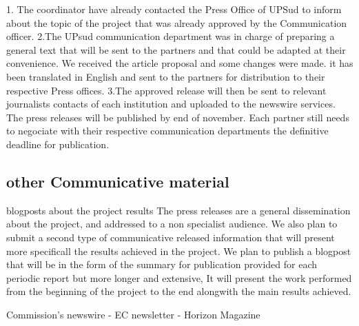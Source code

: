 \documentclass{deliverablereport}
\begin{document}
 1. The coordinator have already contacted the Press Office of UPSud to inform about the topic
 of the project that was already approved by the Communication officer. 
 2.The UPsud communication department was in charge of preparing a general text that will be sent
 to the partners and that could be adapted at their convenience. We received the article proposal 
 and some changes were made. it has been translated in English and sent to the partners 
 for distribution to their respective Press offices. 
 3.The approved release will then be sent to relevant journalists contacts of each institution 
 and uploaded to the newswire services. The press releases will be published by end of november. 
 Each partner still needs to negociate with their respective communication departments the 
 definitive deadline for publication.



\subsection{other Communicative material}

 \item blogposts about the project results
 The press releases are a general dissemination about the project, and addressed to 
 a non specialist audience. We also plan to submit a second type of communicative released 
 information that will present more specificall the results achieved in the project.
 We plan to publish a blogpost that will be in the form of the summary for publication
 provided for each periodic report but more longer and  extensive, It will present the 
 work performed from the beginning of the project to the end alongwith the main results achieved.
 
 \European Commission's newswire
 - EC newsletter
 - Horizon Magazine
\end{document}
